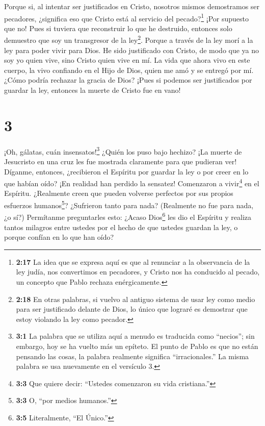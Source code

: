  Porque si, al intentar ser justificados en Cristo,
nosotros mismos demostramos ser pecadores, ¿significa eso que Cristo
está al servicio del pecado?\footnote{\textbf{2:17} La idea que se
  expresa aquí es que al renunciar a la observancia de la ley judía, nos
  convertimos en pecadores, y Cristo nos ha conducido al pecado, un
  concepto que Pablo rechaza enérgicamente.} ¡Por supuesto que no!
 Pues si tuviera que reconstruir lo que he destruido,
entonces solo demuestro que soy un transgresor de la ley\footnote{\textbf{2:18}
  En otras palabras, si vuelvo al antiguo sistema de usar ley como medio
  para ser justificado delante de Dios, lo único que lograré es
  demostrar que estoy violando la ley como pecador.}. 
Porque a través de la ley morí a la ley para poder vivir para Dios.
 He sido justificado con Cristo, de modo que ya no soy yo
quien vive, sino Cristo quien vive en mí. La vida que ahora vivo en este
cuerpo, la vivo confiando en el Hijo de Dios, quien me amó y se entregó
por mí.  ¿Cómo podría rechazar la gracia de Dios? ¡Pues si
podemos ser justificados por guardar la ley, entonces la muerte de
Cristo fue en vano!

\hypertarget{section-2}{%
\section{3}\label{section-2}}

 ¡Oh, gálatas, cuán insensatos!\footnote{\textbf{3:1} La
  palabra que se utiliza aquí a menudo es traducida como ``necios''; sin
  embargo, hoy se ha vuelto más un epíteto. El punto de Pablo es que no
  están pensando las cosas, la palabra realmente significa
  ``irracionales.'' La misma palabra se usa nuevamente en el versículo
  3.} ¿Quién los puso bajo hechizo? ¡La muerte de Jesucristo en una cruz
les fue mostrada claramente para que pudieran ver!  Díganme,
entonces, ¿recibieron el Espíritu por guardar la ley o por creer en lo
que habían oído?  ¡En realidad han perdido la sensatez!
Comenzaron a vivir\footnote{\textbf{3:3} Que quiere decir: ``Ustedes
  comenzaron su vida cristiana.''} en el Espíritu. ¿Realmente creen que
pueden volverse perfectos por sus propios esfuerzos humanos\footnote{\textbf{3:3}
  O, ``por medios humanos.''}?  ¿Sufrieron tanto para nada?
(Realmente no fue para nada, ¿o sí?)  Permítanme
preguntarles esto: ¿Acaso Dios\footnote{\textbf{3:5} Literalmente, ``El
  Único.''} les dio el Espíritu y realiza tantos milagros entre ustedes
por el hecho de que ustedes guardan la ley, o porque confían en lo que
han oído?

